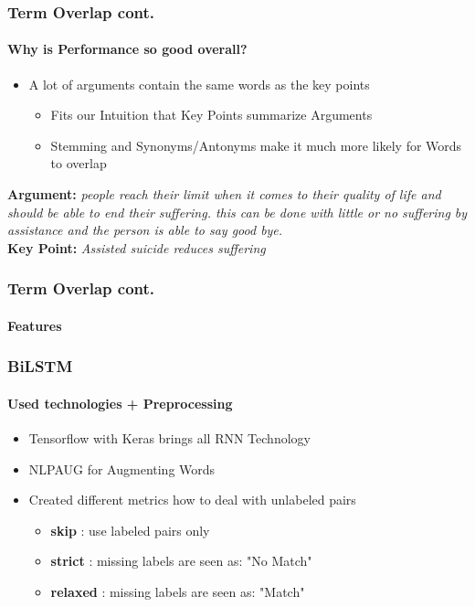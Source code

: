 \documentclass[english,handout]{mlutalk}
\begin{document}
\begin{frame}
  \frametitle{Term Overlap cont.}
  \framesubtitle{Why is Performance so good overall?}
    
    \begin{itemize}
      \item A lot of arguments contain the same words as the key points
        \begin{itemize}
          \item Fits our Intuition that Key Points summarize Arguments
          \item Stemming and Synonyms/Antonyms make it much more likely for Words to overlap
        \end{itemize}
    \end{itemize}

    \begin{example}
      \textbf{Argument:} \textit{people reach their limit when it comes to their quality of life and should be able to end their suffering. this can be done with little or no suffering by assistance and the person is able to say good bye.}\\
      \textbf{Key Point:} \textit{Assisted suicide reduces suffering}
    \end{example}

\end{frame}

\begin{frame}
  \frametitle{Term Overlap cont.}
  \framesubtitle{Features}
    
    
\end{frame}

\begin{frame}
  \frametitle{BiLSTM}
  \framesubtitle{Used technologies + Preprocessing}

  \begin{itemize}
    \item Tensorflow with Keras brings all RNN Technology
    \item NLPAUG for Augmenting Words
    
    \item Created different metrics how to deal with unlabeled pairs
      \begin{itemize}
        \item \textbf{skip} : use labeled pairs only
        \item \textbf{strict} : missing labels are seen as: "No Match"
        \item \textbf{relaxed} : missing labels are seen as: "Match"
      \end{itemize}
  \end{itemize}

  

\end{frame}
\end{document}
